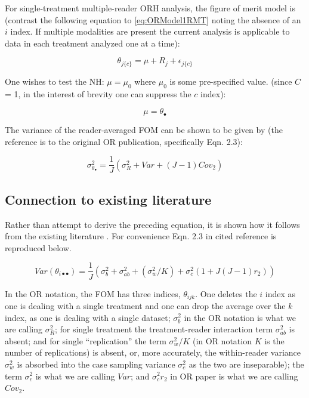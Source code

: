 \documentclass[
]{book}
\begin{document}
For single-treatment multiple-reader ORH analysis, the figure of merit model is (contrast the following equation to \eqref{eq:ORModel1RMT} noting the absence of an \(i\) index. If multiple modalities are present the current analysis is applicable to data in each treatment analyzed one at a time):

\begin{equation}
\theta_{j\{c\}}=\mu+R_j+\epsilon_{j\{c\}}
\label{eq:OrModel1T}
\end{equation}

One wishes to test the NH: \(\mu=\mu_0\) where \(\mu_0\) is some pre-specified value. (since \(C\) = 1, in the interest of brevity one can suppress the \(c\) index):

\begin{equation}
\mu=\theta_{\bullet}
\label{eq:OrModel1REstmu}
\end{equation}

The variance of the reader-averaged FOM can be shown \citep{RN1450} to be given by (the reference is to the original OR publication, specifically Eqn. 2.3):

\begin{equation}
\sigma_{\theta_{\bullet}}^{2}=\frac{1}{J}(\sigma_{R}^{2}+Var+(J-1)Cov_2)
\label{eq:VarThetaiDot}
\end{equation}

\hypertarget{connection-to-existing-literature}{%
\subsection{Connection to existing literature}\label{connection-to-existing-literature}}

Rather than attempt to derive the preceding equation, it is shown how it follows from the existing literature \citep{RN1450}. For convenience Eqn. 2.3 in cited reference is reproduced below.

\begin{equation}
Var(\theta_{i \bullet \bullet}) =\frac{1}{J}(\sigma_{b}^{2}+\sigma_{ab}^{2}+(\sigma_{w}^{2}/K) + \sigma_{c}^{2}(1+J(J-1)r_2))
\label{eq:VarThetaiDotDot}
\end{equation}

In the OR notation, the FOM has three indices, \(\theta_{ijk}\). One deletes the \(i\) index as one is dealing with a single treatment and one can drop the average over the \(k\) index, as one is dealing with a single dataset; \(\sigma_{b}^{2}\) in the OR notation is what we are calling \(\sigma_{R}^{2}\); for single treatment the treatment-reader interaction term \(\sigma_{ab}^{2}\) is absent; and for single ``replication'' the term \(\sigma_{w}^{2}/K\) (in OR notation \(K\) is the number of replications) is absent, or, more accurately, the within-reader variance \(\sigma_{w}^{2}\) is absorbed into the case sampling variance \(\sigma_{c}^{2}\) as the two are inseparable); the term \(\sigma_{\epsilon}^{2}\) is what we are calling \(Var\); and \(\sigma_{c}^{2}r_2\) in OR paper is what we are calling \(Cov_2\).
\end{document}
